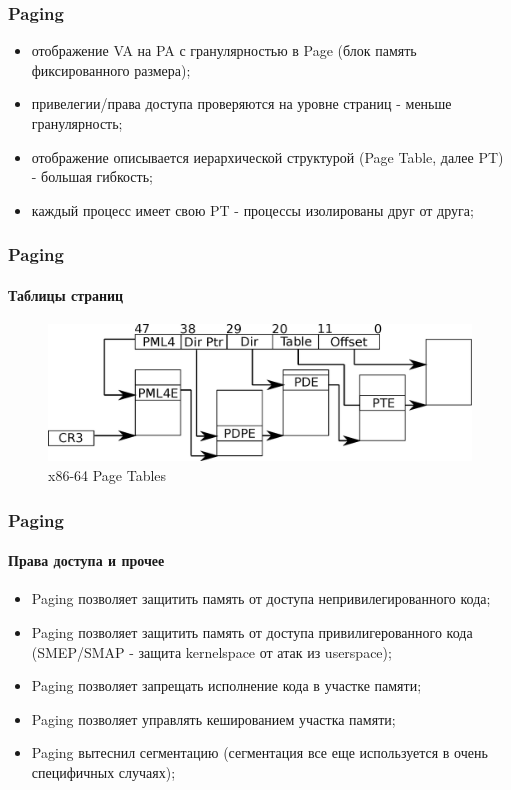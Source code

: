 \begin{frame}
\frametitle{Paging}

\begin{itemize}
  \item отображение VA на PA с гранулярностью в Page (блок память фиксированного размера);
  \item привелегии/права доступа проверяются на уровне страниц - меньше гранулярность;
  \item отображение описывается иерархической структурой (Page Table, далее PT) - большая гибкость;
  \item каждый процесс имеет свою PT - процессы изолированы друг от друга;
\end{itemize}
\end{frame}

\begin{frame}
\frametitle{Paging}
\framesubtitle{Таблицы страниц}

\begin{figure}
  \centering\includegraphics[width=.9\linewidth]{arch-page}
  \caption{x86-64 Page Tables}
\end{figure}
\end{frame}

\begin{frame}
\frametitle{Paging}
\framesubtitle{Права доступа и прочее}

\begin{itemize}
  \item Paging позволяет защитить память от доступа непривилегированного кода;
  \item Paging позволяет защитить память от доступа привилигерованного кода (SMEP/SMAP - защита kernelspace от атак из userspace);
  \item Paging позволяет запрещать исполнение кода в участке памяти;
  \item Paging позволяет управлять кешированием участка памяти;
  \item Paging вытеснил сегментацию (сегментация все еще используется в очень специфичных случаях);
\end{itemize}
\end{frame}

